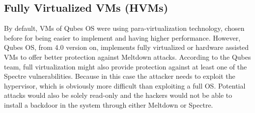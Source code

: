 \documentclass[runningheads,a4paper]{article}
\begin{document}
\subsection{Fully Virtualized VMs (HVMs)}
By default, VMs of Qubes OS were using para-virtualization technology, chosen before for being easier to implement and having higher performance. However, Qubes OS, from 4.0 version on, implements fully virtualized or hardware assisted VMs to offer better protection against Meltdown attacks. According to the Qubes team, full virtualization might also provide protection against at least one of the Spectre vulnerabilities. Because in this case the attacker needs to exploit the hypervisor, which is obviously more difficult than exploiting a full OS. Potential attacks would also be solely read-only and the hackers would not be able to install a backdoor in the system through either Meltdown or Spectre. 






\end{document}
